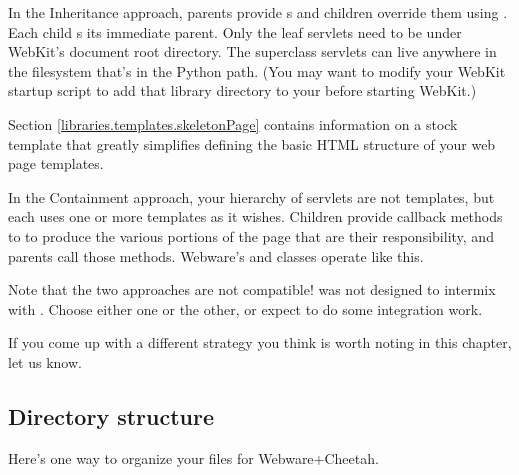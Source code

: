 In the Inheritance approach, parents provide s and children
override them using .  Each child s its immediate
parent.  Only the leaf servlets need to be under WebKit's document root
directory.  The superclass servlets can live anywhere in the filesystem
that's in the Python path.  (You may want to modify your WebKit startup 
script to add that library directory to your  before starting
WebKit.)


Section \ref{libraries.templates.skeletonPage} contains information on a stock
template that greatly simplifies defining the basic HTML structure of your web
page templates.  

In the Containment approach, your hierarchy of servlets are not templates, but
each uses one or more templates as it wishes.  Children provide callback
methods to to produce the various portions of the page that are their
responsibility, and parents call those methods.  Webware's 
and  classes operate like this.


Note that the two approaches are not compatible!   was not
designed to intermix with .  Choose either
one or the other, or expect to do some integration work.  

If you come up with a different strategy you think is worth noting in this
chapter, let us know.


\subsection{Directory structure}
\label{webware.directoryStructure}

Here's one way to organize your files for Webware+Cheetah.

